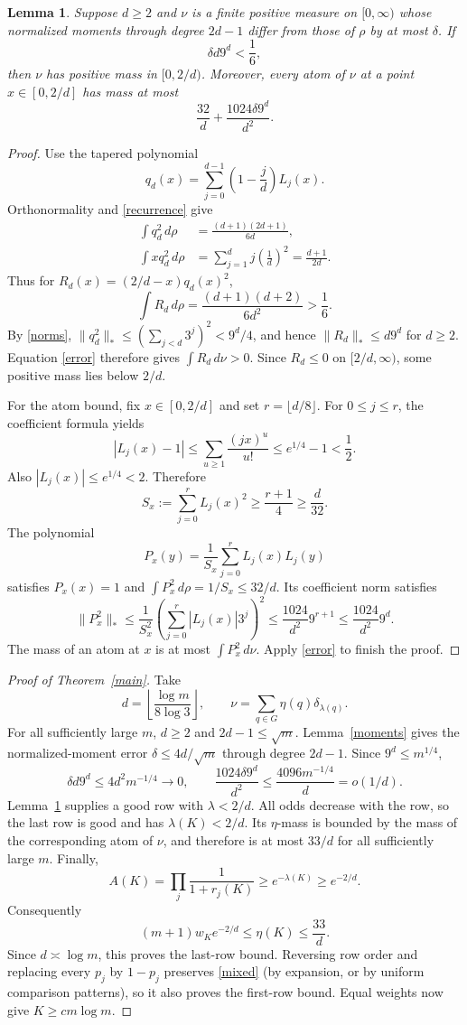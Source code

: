\documentclass[11pt]{article}
\newtheorem{lemma}[theorem]{Lemma}
\begin{document}
\begin{lemma}\label{laguerre}
Suppose $d\ge2$ and $\nu$ is a finite positive measure on $[0,\infty)$
whose normalized moments through degree $2d-1$ differ from those of
$\rho$ by at most $\delta$. If
\[
 \delta d9^d<\frac16,
\]
then $\nu$ has positive mass in $[0,2/d)$. Moreover, every atom of
$\nu$ at a point $x\in[0,2/d]$ has mass at most
\[
 \frac{32}{d}+\frac{1024\delta9^d}{d^2}.
\]
\end{lemma}
\begin{proof}
Use the tapered polynomial
\[
 q_d(x)=\sum_{j=0}^{d-1}\left(1-\frac jd\right)L_j(x).
\]
Orthonormality and \eqref{recurrence} give
\begin{align*}
 \int q_d^2\,d\rho
 &=\frac{(d+1)(2d+1)}{6d},\\
 \int xq_d^2\,d\rho
 &=\sum_{j=1}^{d}j\left(\frac1d\right)^2
 =\frac{d+1}{2d}.
\end{align*}
Thus for $R_d(x)=(2/d-x)q_d(x)^2$,
\[
 \int R_d\,d\rho=\frac{(d+1)(d+2)}{6d^2}>\frac16.
\]
By \eqref{norms}, $\|q_d^2\|_*\le(\sum_{j<d}3^j)^2<9^d/4$,
and hence $\|R_d\|_*\le d9^d$ for $d\ge2$.
Equation \eqref{error} therefore gives $\int R_d\,d\nu>0$.
Since $R_d\le0$ on $[2/d,\infty)$, some positive mass lies below
$2/d$.

For the atom bound, fix $x\in[0,2/d]$ and set $r=\lfloor d/8\rfloor$.
For $0\le j\le r$, the coefficient formula yields
\[
 |L_j(x)-1|\le\sum_{u\ge1}\frac{(jx)^u}{u!}
 \le e^{1/4}-1<\frac12.
\]
Also $|L_j(x)|\le e^{1/4}<2$. Therefore
\[
 S_x:=\sum_{j=0}^r L_j(x)^2\ge\frac{r+1}{4}\ge\frac d{32}.
\]
The polynomial
\[
 P_x(y)=\frac1{S_x}\sum_{j=0}^r L_j(x)L_j(y)
\]
satisfies $P_x(x)=1$ and $\int P_x^2\,d\rho=1/S_x\le32/d$.
Its coefficient norm satisfies
\[
 \|P_x^2\|_*
 \le\frac1{S_x^2}\left(\sum_{j=0}^r |L_j(x)|3^j\right)^2
 \le\frac{1024}{d^2}9^{r+1}
 \le\frac{1024}{d^2}9^d.
\]
The mass of an atom at $x$ is at most $\int P_x^2\,d\nu$.
Apply \eqref{error} to finish the proof.
\end{proof}

\begin{proof}[Proof of Theorem~\ref{main}]
Take
\[
 d=\left\lfloor\frac{\log m}{8\log3}\right\rfloor,
 \qquad \nu=\sum_{q\in G}\eta(q)\delta_{\lambda(q)}.
\]
For all sufficiently large $m$, $d\ge2$ and $2d-1\le\sqrt m$.
Lemma~\ref{moments} gives the normalized-moment error
$\delta\le4d/\sqrt m$ through degree $2d-1$. Since $9^d\le m^{1/4}$,
\[
 \delta d9^d\le4d^2m^{-1/4}\longrightarrow0,
 \qquad
 \frac{1024\delta9^d}{d^2}
 \le\frac{4096m^{-1/4}}d=o(1/d).
\]
Lemma~\ref{laguerre} supplies a good row with $\lambda<2/d$.
All odds decrease with the row, so the last row is good and has
$\lambda(K)<2/d$. Its $\eta$-mass is bounded by the mass of the
corresponding atom of $\nu$, and therefore is at most $33/d$ for all
sufficiently large $m$.
Finally,
\[
 A(K)=\prod_j\frac1{1+r_j(K)}\ge e^{-\lambda(K)}\ge e^{-2/d}.
\]
Consequently
\[
 (m+1)w_K e^{-2/d}\le\eta(K)\le\frac{33}d.
\]
Since $d\asymp\log m$, this proves the last-row bound. Reversing row
order and replacing every $p_j$ by $1-p_j$ preserves \eqref{mixed}
(by expansion, or by uniform comparison patterns), so it also proves
the first-row bound. Equal weights now give $K\ge c m\log m$.
\end{proof}
\end{document}
